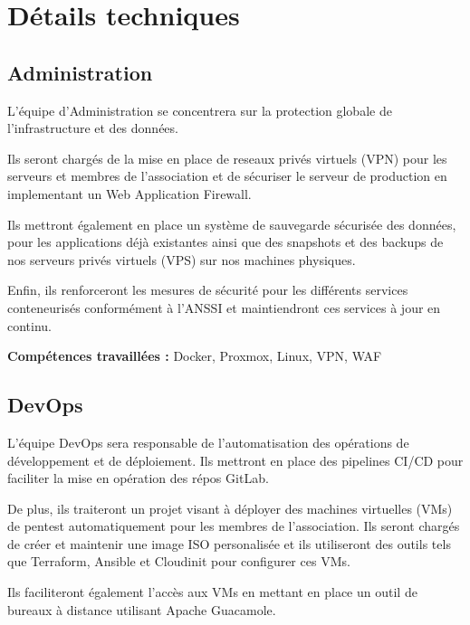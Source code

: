 \documentclass[12pt]{article}
\begin{document}
    \section{Détails techniques}

    \subsection{Administration}
    L'équipe d'Administration se concentrera sur la protection globale de l'infrastructure et des données. 
    \bigskip
    
    \noindent Ils seront chargés de la mise en place de reseaux privés virtuels (VPN) pour les serveurs et membres de l'association et de sécuriser le serveur de production en implementant un Web Application Firewall. 
    \bigskip

    \noindent Ils mettront également en place un système de sauvegarde sécurisée des données, pour les applications déjà existantes ainsi que des snapshots et des backups de nos serveurs privés virtuels (VPS) sur nos machines physiques. 
    \bigskip

    \noindent Enfin, ils renforceront les mesures de sécurité pour les différents services conteneurisés conformément  à l'ANSSI et maintiendront ces services à jour en continu.
    
    \bigskip

    \noindent \textbf{Compétences travaillées :} Docker, Proxmox, Linux, VPN, WAF
    
    \subsection{DevOps}
    L'équipe DevOps sera responsable de l'automatisation des opérations de développement et de déploiement. Ils mettront en place des pipelines CI/CD pour faciliter la mise en opération des répos GitLab. 
    \bigskip

    \noindent De plus, ils traiteront un projet visant à déployer des machines virtuelles (VMs) de pentest automatiquement pour les membres de l'association. Ils seront chargés de créer et maintenir une image ISO personalisée et ils utiliseront des outils tels que Terraform, Ansible et Cloudinit pour configurer ces VMs. 
    \bigskip

    \noindent Ils faciliteront également l'accès aux VMs en mettant en place un outil de bureaux à distance utilisant Apache Guacamole.
    
    \bigskip
\end{document}
